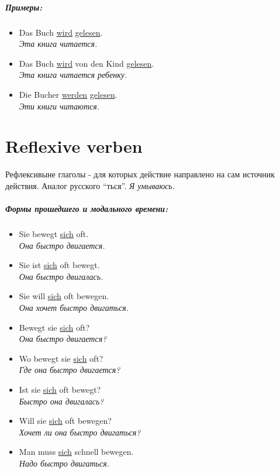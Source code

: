\documentclass[12pt]{report}
\newcommand{\satzew}[1]{\underline{#1}}
\newcommand{\ubersatze}[1]{\textit{#1}}
\begin{document}
\paragraph{Примеры:}
\begin{itemize}
\item Das Buch \satzew{wird} \satzew{gelesen}.
~\\ \ubersatze{Эта книга читается.}
\item Das Buch \satzew{wird} von den Kind \satzew{gelesen}.
~\\ \ubersatze{Эта книга читается ребенку.}
\item Die Bucher \satzew{werden} \satzew{gelesen}.
~\\ \ubersatze{Эти книги читаются.}
\end{itemize}

\chapter{Reflexive verben}
Рефлексивыне глаголы - для которых действие направлено на сам источник действия. Аналог русского ``ться''. \ubersatze{Я умываюсь.}
\paragraph{Формы прошедшего и модального времени:}
\begin{itemize}
\item Sie bewegt \satzew{sich} oft.
~\\ \ubersatze{Она быстро двигается.}
\item Sie ist \satzew{sich} oft bewegt.
~\\ \ubersatze{Она быстро двигалась.}
\item Sie will \satzew{sich} oft bewegen.
~\\ \ubersatze{Она хочет быстро двигаться.}
\item Bewegt sie \satzew{sich} oft? 
~\\ \ubersatze{Она быстро двигается?}
\item Wo bewegt sie \satzew{sich} oft?
~\\ \ubersatze{Где она быстро двигается?}
\item Ist sie \satzew{sich} oft bewegt? 
~\\ \ubersatze{Быстро она двигалась?}
\item Will sie \satzew{sich} oft bewegen?
~\\ \ubersatze{Хочет ли она быстро двигаться?}
\item Man muss \satzew{sich} schnell bewegen.
~\\ \ubersatze{Надо быстро двигаться.}
\end{itemize}
\end{document}
